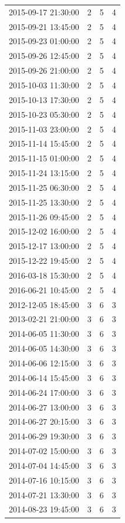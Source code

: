 \begin{tabular}{lrrr}
2015-09-17 21:30:00 & 2 & 5 & 4 \\
2015-09-21 13:45:00 & 2 & 5 & 4 \\
2015-09-23 01:00:00 & 2 & 5 & 4 \\
2015-09-26 12:45:00 & 2 & 5 & 4 \\
2015-09-26 21:00:00 & 2 & 5 & 4 \\
2015-10-03 11:30:00 & 2 & 5 & 4 \\
2015-10-13 17:30:00 & 2 & 5 & 4 \\
2015-10-23 05:30:00 & 2 & 5 & 4 \\
2015-11-03 23:00:00 & 2 & 5 & 4 \\
2015-11-14 15:45:00 & 2 & 5 & 4 \\
2015-11-15 01:00:00 & 2 & 5 & 4 \\
2015-11-24 13:15:00 & 2 & 5 & 4 \\
2015-11-25 06:30:00 & 2 & 5 & 4 \\
2015-11-25 13:30:00 & 2 & 5 & 4 \\
2015-11-26 09:45:00 & 2 & 5 & 4 \\
2015-12-02 16:00:00 & 2 & 5 & 4 \\
2015-12-17 13:00:00 & 2 & 5 & 4 \\
2015-12-22 19:45:00 & 2 & 5 & 4 \\
2016-03-18 15:30:00 & 2 & 5 & 4 \\
2016-06-21 10:45:00 & 2 & 5 & 4 \\
2012-12-05 18:45:00 & 3 & 6 & 3 \\
2013-02-21 21:00:00 & 3 & 6 & 3 \\
2014-06-05 11:30:00 & 3 & 6 & 3 \\
2014-06-05 14:30:00 & 3 & 6 & 3 \\
2014-06-06 12:15:00 & 3 & 6 & 3 \\
2014-06-14 15:45:00 & 3 & 6 & 3 \\
2014-06-24 17:00:00 & 3 & 6 & 3 \\
2014-06-27 13:00:00 & 3 & 6 & 3 \\
2014-06-27 20:15:00 & 3 & 6 & 3 \\
2014-06-29 19:30:00 & 3 & 6 & 3 \\
2014-07-02 15:00:00 & 3 & 6 & 3 \\
2014-07-04 14:45:00 & 3 & 6 & 3 \\
2014-07-16 10:15:00 & 3 & 6 & 3 \\
2014-07-21 13:30:00 & 3 & 6 & 3 \\
2014-08-23 19:45:00 & 3 & 6 & 3 \\

\end{tabular}
